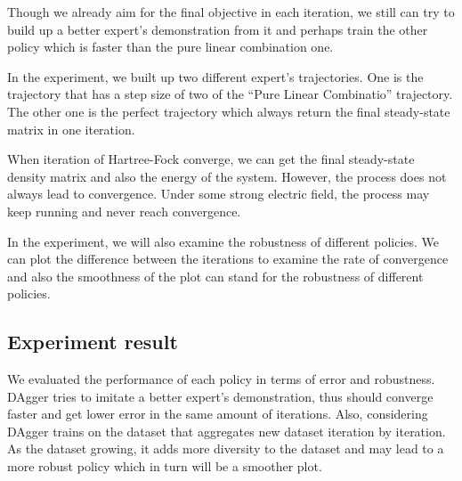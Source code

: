 \documentclass[twoside]{article}
\begin{document}
Though we already aim for the final objective in each iteration, we still can try to build up a better expert's demonstration from it and perhaps train the other policy which is faster than the pure linear combination one.

In the experiment, we built up two different expert's trajectories. 
One is the trajectory that has a step size of two of the ``Pure Linear Combinatio'' trajectory. The other one is the perfect trajectory which always return the final steady-state matrix in one iteration.


When iteration of Hartree-Fock converge, we can get the final steady-state density matrix and also the energy of the system. However, the process does not always lead to convergence. Under some strong electric field, the process may keep running and never reach convergence.

In the experiment, we will also examine the robustness of different policies.
We can plot the difference between the iterations to examine the rate of convergence and also the smoothness of the plot can stand for the robustness of different policies.





 


\subsection{Experiment result}


We evaluated the performance of each policy in terms of error and robustness. 
DAgger tries to imitate a better expert's demonstration, thus should converge faster and get lower error in the same amount of iterations. Also, considering DAgger trains on the dataset that aggregates new dataset iteration by iteration. As the dataset growing, it adds more diversity to the dataset and may lead to a more robust policy which in turn will be a smoother plot.
\end{document}
